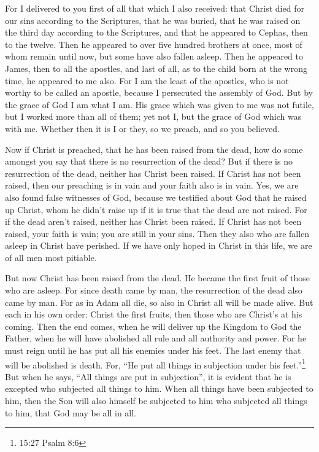  For I delivered to you first of all that which I also
received: that Christ died for our sins according to the Scriptures,
 that he was buried, that he was raised on the third day
according to the Scriptures,  and that he appeared to
Cephas, then to the twelve.  Then he appeared to over five
hundred brothers at once, most of whom remain until now, but some have
also fallen asleep.  Then he appeared to James, then to all
the apostles,  and last of all, as to the child born at the
wrong time, he appeared to me also.  For I am the least of
the apostles, who is not worthy to be called an apostle, because I
persecuted the assembly of God.  But by the grace of God I
am what I am. His grace which was given to me was not futile, but I
worked more than all of them; yet not I, but the grace of God which was
with me.  Whether then it is I or they, so we preach, and
so you believed.

 Now if Christ is preached, that he has been raised from
the dead, how do some amongst you say that there is no resurrection of
the dead?  But if there is no resurrection of the dead,
neither has Christ been raised.  If Christ has not been
raised, then our preaching is in vain and your faith also is in vain.
 Yes, we are also found false witnesses of God, because we
testified about God that he raised up Christ, whom he didn't raise up if
it is true that the dead are not raised.  For if the dead
aren't raised, neither has Christ been raised.  If Christ
has not been raised, your faith is vain; you are still in your sins.
 Then they also who are fallen asleep in Christ have
perished.  If we have only hoped in Christ in this life, we
are of all men most pitiable.

 But now Christ has been raised from the dead. He became
the first fruit of those who are asleep.  For since death
came by man, the resurrection of the dead also came by man.
 For as in Adam all die, so also in Christ all will be made
alive.  But each in his own order: Christ the first fruits,
then those who are Christ's at his coming.  Then the end
comes, when he will deliver up the Kingdom to God the Father, when he
will have abolished all rule and all authority and power. 
For he must reign until he has put all his enemies under his feet.
 The last enemy that will be abolished is death.
 For, ``He put all things in subjection under his
feet.''\footnote{15:27 Psalm 8:6} But when he says, ``All things are put
in subjection'', it is evident that he is excepted who subjected all
things to him.  When all things have been subjected to him,
then the Son will also himself be subjected to him who subjected all
things to him, that God may be all in all.

